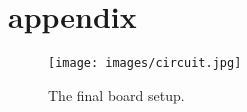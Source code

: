 \section{appendix}
\label{section:appendix}



\listoffigures


\begin{figure}[h]
\centering
\texttt{[image: images/circuit.jpg]}
\caption{\label{fig:board}The final board setup.}
\end{figure}

